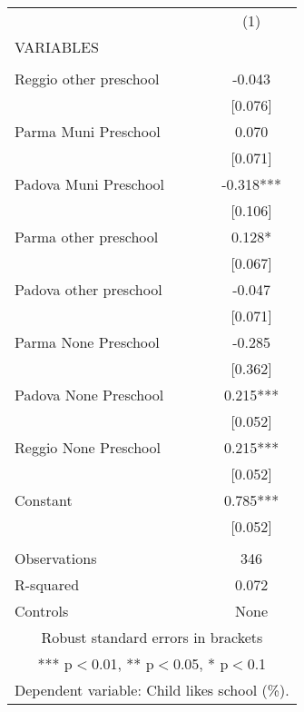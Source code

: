 \begin{tabular}{lc} \hline
 & (1) \\
VARIABLES &  \\ \hline
 &  \\
Reggio other preschool & -0.043 \\
 & [0.076] \\
Parma Muni Preschool & 0.070 \\
 & [0.071] \\
Padova Muni Preschool & -0.318*** \\
 & [0.106] \\
Parma other preschool & 0.128* \\
 & [0.067] \\
Padova other preschool & -0.047 \\
 & [0.071] \\
Parma None Preschool & -0.285 \\
 & [0.362] \\
Padova None Preschool & 0.215*** \\
 & [0.052] \\
Reggio None Preschool & 0.215*** \\
 & [0.052] \\
Constant & 0.785*** \\
 & [0.052] \\
 &  \\
Observations & 346 \\
R-squared & 0.072 \\
 Controls & None \\ \hline
\multicolumn{2}{c}{ Robust standard errors in brackets} \\
\multicolumn{2}{c}{ *** p$<$0.01, ** p$<$0.05, * p$<$0.1} \\
\multicolumn{2}{c}{ Dependent variable: Child likes school (\%).} \\
\end{tabular}

